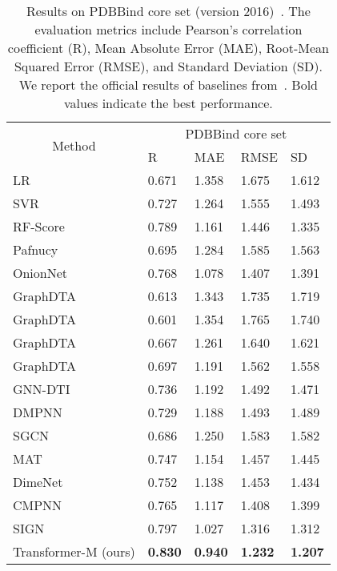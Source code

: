 \documentclass{article} \usepackage[dvipsnames]{xcolor}
\begin{document}
\begin{table}[t]
\small
\centering
\caption{Results on PDBBind core set (version 2016)~\citep{wang2004pdbbind,wang2005pdbbind}. The evaluation metrics include Pearson's correlation coefficient (R), Mean Absolute Error (MAE), Root-Mean Squared Error (RMSE), and Standard Deviation (SD). We report the official results of baselines from~\citet{li2021structure}. Bold values indicate the best performance.}
\label{tab:pdb-table}
\setlength\tabcolsep{5pt}
\addtolength{\tabcolsep}{-2pt}
\begin{tabular}{l|llll}
\toprule
\multicolumn{1}{c|}{\multirow{2}{*}{Method}}                    & \multicolumn{4}{c}{PDBBind core set}                                   \\
\cline{2-5}
\multicolumn{1}{c|}{}                                           & R    & MAE    & RMSE  & SD  \\
\hline
LR                                                               & 0.671  & 1.358      & 1.675     & 1.612   \\
SVR                                                              & 0.727 & 1.264    & 1.555     & 1.493  \\
RF-Score~\citep{Ballester2010A}                  & 0.789  & 1.161     & 1.446    & 1.335  \\
\hline
Pafnucy~\citep{stepniewska2018development}       & 0.695  & 1.284      & 1.585     & 1.563   \\
OnionNet~\citep{2019OnionNet}                    & 0.768  & 1.078      & 1.407     & 1.391   \\
\hline
GraphDTA~\citep{2020GraphDTA}     & 0.613  & 1.343      & 1.735     & 1.719   \\
GraphDTA~\citep{2020GraphDTA}     & 0.601  & 1.354      & 1.765     & 1.740   \\
GraphDTA~\citep{2020GraphDTA}     & 0.667  & 1.261      & 1.640    & 1.621   \\
GraphDTA~\citep{2020GraphDTA} & 0.697 & 1.191     & 1.562    & 1.558   \\
\hline
GNN-DTI~\citep{2019Predicting}                   & 0.736  & 1.192      & 1.492     & 1.471   \\
DMPNN~\citep{2019Analyzing}                      & 0.729  & 1.188     & 1.493     & 1.489   \\
SGCN~\citep{danel2020spatial}                    & 0.686  & 1.250      & 1.583      & 1.582    \\
MAT~\citep{maziarka2020molecule}                 & 0.747   & 1.154     & 1.457     & 1.445    \\
DimeNet~\citep{klicpera2020directional}          & 0.752   & 1.138       & 1.453      & 1.434    \\
CMPNN~\citep{2020Communicative}                  & 0.765   & 1.117      & 1.408      & 1.399    \\
SIGN~\citep{li2021structure}                     & 0.797   & 1.027       & 1.316    & 1.312    \\
\hline
Transformer-M (ours)                                              & \textbf{0.830}              & \textbf{0.940 }                  & \textbf{1.232 }                & \textbf{1.207}


\end{tabular}
\end{table}
\end{document}
